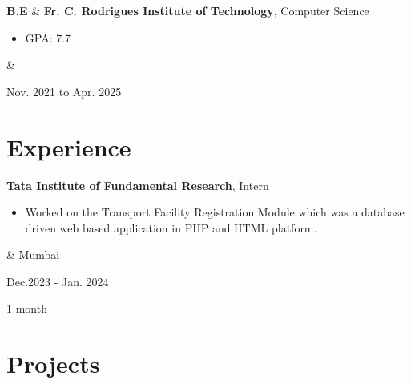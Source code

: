 \documentclass[12pt, letterpaper]{article}
\newenvironment{highlights}{
        \begin{itemize}[
                topsep=0pt,
                parsep=0.10 cm,
                partopsep=0pt,
                itemsep=0pt,
                after=\vspace{-1\baselineskip},
                leftmargin=0.4 cm + 3pt
            ]
    }{
        \end{itemize}
    } %
\let\originalTabularx\tabularx
\let\originalEndTabularx\endtabularx
\renewenvironment{tabularx}{\bgroup\centering\originalTabularx}{\originalEndTabularx\par\egroup}
\begin{document}
        \begin{tabularx}{
            \textwidth-0.4 cm-0.13cm
        }{
            L{1.5cm}
            K{0.2 cm}
            R{4.1 cm}
        }
            \textbf{B.E}
            &
            \textbf{Fr. C. Rodrigues Institute of Technology}, Computer Science

            \vspace{0.10 cm}

            \begin{highlights}
                \item GPA: 7.7 
            \end{highlights}
            &
            

            Nov. 2021 to Apr. 2025
        \end{tabularx}


    
    \section{Experience}

        \begin{tabularx}{
            \textwidth-0.4 cm-0.13cm
        }{
            K{0.2 cm}
            R{4.1 cm}
        }
            \textbf{Tata Institute of Fundamental Research}, Intern

            \vspace{0.10 cm}

            \begin{highlights}
                \item Worked on the Transport Facility Registration Module which was a database driven web based application in PHP and HTML platform.
            \end{highlights}
            &
             Mumbai

            Dec.2023 - Jan. 2024

            1 month
        \end{tabularx}

        


 


    
    \section{Projects}
\end{document}
